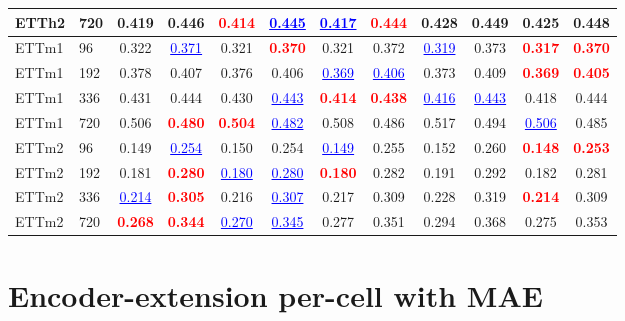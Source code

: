 \begin{table}[h]
\begin{center}
\begin{tabular}{ll|cc|cc|cc|cc|cc}
    ETTh2 & 720 & 0.419 & 0.446 & \textcolor{red}{\textbf{0.414}} & \textcolor{blue}{\underline{0.445}} & \textcolor{blue}{\underline{0.417}} & \textcolor{red}{\textbf{0.444}} & 0.428 & 0.449 & 0.425 & 0.448 \\
    \midrule
    ETTm1 & 96  & 0.322 & \textcolor{blue}{\underline{0.371}} & 0.321 & \textcolor{red}{\textbf{0.370}} & 0.321 & 0.372 & \textcolor{blue}{\underline{0.319}} & 0.373 & \textcolor{red}{\textbf{0.317}} & \textcolor{red}{\textbf{0.370}} \\
    ETTm1 & 192 & 0.378 & 0.407 & 0.376 & 0.406 & \textcolor{blue}{\underline{0.369}} & \textcolor{blue}{\underline{0.406}} & 0.373 & 0.409 & \textcolor{red}{\textbf{0.369}} & \textcolor{red}{\textbf{0.405}} \\
    ETTm1 & 336 & 0.431 & 0.444 & 0.430 & \textcolor{blue}{\underline{0.443}} & \textcolor{red}{\textbf{0.414}} & \textcolor{red}{\textbf{0.438}} & \textcolor{blue}{\underline{0.416}} & \textcolor{blue}{\underline{0.443}} & 0.418 & 0.444 \\
    ETTm1 & 720 & 0.506 & \textcolor{red}{\textbf{0.480}} & \textcolor{red}{\textbf{0.504}} & \textcolor{blue}{\underline{0.482}} & 0.508 & 0.486 & 0.517 & 0.494 & \textcolor{blue}{\underline{0.506}} & 0.485 \\
    \midrule
    ETTm2 & 96  & 0.149 & \textcolor{blue}{\underline{0.254}} & 0.150 & 0.254 & \textcolor{blue}{\underline{0.149}} & 0.255 & 0.152 & 0.260 & \textcolor{red}{\textbf{0.148}} & \textcolor{red}{\textbf{0.253}} \\
    ETTm2 & 192 & 0.181 & \textcolor{red}{\textbf{0.280}} & \textcolor{blue}{\underline{0.180}} & \textcolor{blue}{\underline{0.280}} & \textcolor{red}{\textbf{0.180}} & 0.282 & 0.191 & 0.292 & 0.182 & 0.281 \\
    ETTm2 & 336 & \textcolor{blue}{\underline{0.214}} & \textcolor{red}{\textbf{0.305}} & 0.216 & \textcolor{blue}{\underline{0.307}} & 0.217 & 0.309 & 0.228 & 0.319 & \textcolor{red}{\textbf{0.214}} & 0.309 \\
    ETTm2 & 720 & \textcolor{red}{\textbf{0.268}} & \textcolor{red}{\textbf{0.344}} & \textcolor{blue}{\underline{0.270}} & \textcolor{blue}{\underline{0.345}} & 0.277 & 0.351 & 0.294 & 0.368 & 0.275 & 0.353 \\
    \bottomrule
  \end{tabular}
  \end{center}
\end{table}

\section{Encoder-extension per-cell with MAE}
\label{app:encoder-cells}

